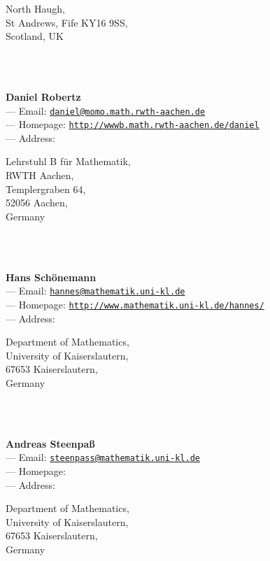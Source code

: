 \documentclass[a4paper,11pt]{report}
\begin{document}
\begin{titlepage}
{\begin{minipage}[t]{8cm}
 North Haugh, \\
 St Andrews, Fife KY16 9SS, \\
 Scotland, UK \end{minipage}
}\\
{\mbox{}\\
\small \noindent \textbf{Daniel Robertz\\
    } --- Email: \href{mailto://daniel@momo.math.rwth-aachen.de} {\texttt{daniel@momo.math.rwth-aachen.de}}\\
 --- Homepage: \href{http://wwwb.math.rwth-aachen.de/~daniel} {\texttt{http://wwwb.math.rwth-aachen.de/\texttt{}daniel}}\\
 --- Address: \begin{minipage}[t]{8cm}\noindent
 Lehrstuhl B f{\"u}r Mathematik, \\
 RWTH Aachen, \\
 Templergraben 64, \\
 52056 Aachen, \\
 Germany \end{minipage}
}\\
{\mbox{}\\
\small \noindent \textbf{Hans Sch{\"o}nemann\\
    } --- Email: \href{mailto://hannes@mathematik.uni-kl.de} {\texttt{hannes@mathematik.uni-kl.de}}\\
 --- Homepage: \href{http://www.mathematik.uni-kl.de/~hannes/} {\texttt{http://www.mathematik.uni-kl.de/\texttt{}hannes/}}\\
 --- Address: \begin{minipage}[t]{8cm}\noindent
 Department of Mathematics, \\
 University of Kaiserslautern, \\
 67653 Kaiserslautern, \\
 Germany \end{minipage}
}\\
{\mbox{}\\
\small \noindent \textbf{Andreas Steenpa{\ss}\\
    } --- Email: \href{mailto://steenpass@mathematik.uni-kl.de} {\texttt{steenpass@mathematik.uni-kl.de}}\\
 --- Homepage: \href{} {\texttt{}}\\
 --- Address: \begin{minipage}[t]{8cm}\noindent
 Department of Mathematics, \\
 University of Kaiserslautern, \\
 67653 Kaiserslautern, \\
 Germany \end{minipage}
}\\
\end{titlepage}
\end{document}
